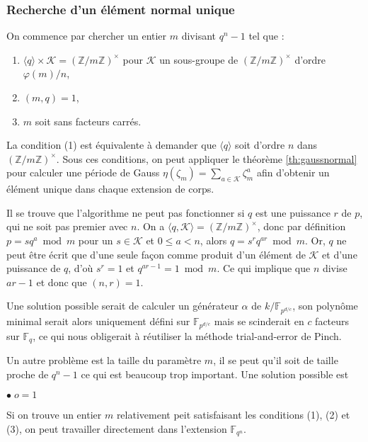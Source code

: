 \documentclass[a4paper]{article} %
\numberwithin{section}{part}
\numberwithin{equation}{section}
\newcommand\zmodninv[1]{(\mathbb{Z}/#1\mathbb{Z})^{\times}}
\newcommand\GF[1]{\mathbb{F}_{#1}}
\begin{document}
\subsubsection*{Recherche d'un élément normal unique}
On commence par chercher un entier $m$ divisant $q^n - 1$ tel que :
\vspace{0.3cm}
\begin{enumerate}[(1)]
\item $\langle{q}\rangle \times \mathcal{K} = \zmodninv{m}$ pour $\mathcal{K}$ 
un sous-groupe de $\zmodninv{m}$ d'ordre $\varphi(m)/n$,
\item $(m, q) = 1$,
\item $m$ soit sans facteurs carrés.
\end{enumerate}
\vspace{0.3cm}
La condition (1) est équivalente à demander que $\langle{q}\rangle$ soit d'ordre
$n$ dans $\zmodninv{m}$. Sous ces conditions, on peut appliquer le théorème 
\ref{th:gaussnormal} pour calculer une période de Gauss $\eta(\zeta_m) = 
\sum_{a\in\mathcal{K}}{\zeta_m^a}$ afin d'obtenir un élément unique dans chaque
extension de corps.

\begin{rem}
Il se trouve que l'algorithme ne peut pas fonctionner si $q$ est une puissance
$r$ de $p$, qui ne soit pas premier avec $n$. On a 
$\langle{q,\mathcal{K}}\rangle = \zmodninv{m}$, donc par définition $p = 
sq^a\bmod m$ pour un $s\in\mathcal{K}$ et $0 \leq a < n$, alors $q = 
s^rq^{ar}\bmod m$. Or, $q$ ne peut être écrit que d'une seule façon comme 
produit d'un élément de $\mathcal{K}$ et d'une puissance
de $q$, d'où $s^r = 1$ et $q^{ar - 1} = 1 \bmod m$. Ce qui implique que $n$
divise $ar - 1$ et donc que $(n, r) = 1$.\par
Une solution possible serait de calculer un générateur
$\alpha$ de $k/\GF{p^{d/c}}$, son polynôme minimal serait alors uniquement
défini sur $\GF{p^{d/c}}$ mais se scinderait en $c$ facteurs sur $\GF{q}$, ce
qui nous obligerait à réutiliser la méthode trial-and-error de Pinch.
\end{rem}
Un autre problème est la taille du paramètre $m$, il se peut qu'il soit de
taille proche de $q^n - 1$ ce qui est beaucoup trop important. Une solution
possible est 

$\bullet\; o = 1$\par
\vspace{0.2cm}
Si on trouve un entier $m$ relativement peit satisfaisant les conditions (1), 
(2) et (3), on peut travailler directement dans l'extension $\GF{q^n}$.
\end{document}
